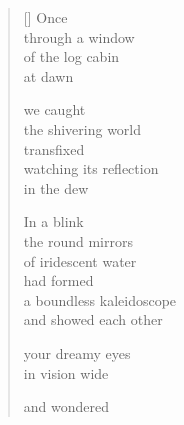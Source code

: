 \documentclass[12pt,a4paper]{article}
\begin{document}
\begin{verse}[\versewidth]
  Once \\
  through a window \\
  of the log cabin \\
  at dawn

  we caught \\
  the shivering world \\
  transfixed \\
  watching its reflection \\
  in the dew

  In a blink \\
  the round mirrors \\
  of iridescent water \\
  had formed \\
  a boundless kaleidoscope \\
  and showed each other

  your dreamy eyes \\
  in vision wide

  and wondered
\end{verse}


\newpage

\poemtitle{}

\settowidth{\versewidth}{Yet you arise in the still second}

\bigskip
\end{document}
